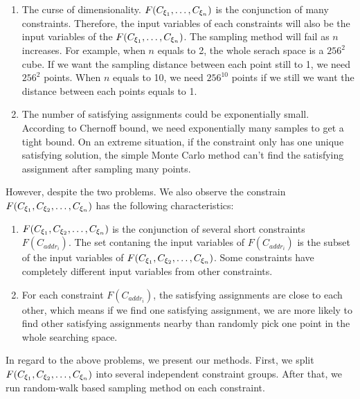 \begin{enumerate}
      \item The curse of dimensionality. $F(C_{{\xi}_{1}},\ldots,C_{{\xi}_{n}})$ is the conjunction of many
      constraints. Therefore, the input variables of each constraints will also be 
      the input variables of the  $F(C_{{\xi}_{1}},\ldots,C_{{\xi}_{n}})$. The sampling method will fail as 
      $n$ increases. For example, when $n$ equals to 2, the whole serach space is 
      a $256^2$ cube. If we want the sampling distance between each point still to 1,
      we need $256^2$ points. When $n$ equals to 10, we need $256^{10}$ points if we 
      still we want the distance between each points equals to 1. 

      \item The number of satisfying assignments could be exponentially small.
      According to Chernoff bound, we need exponentially many samples to get 
      a tight bound. On an extreme situation, if the constraint only has one unique
      satisfying solution, the simple Monte Carlo method can't find the satisfying
      assignment after sampling many points.
\end{enumerate}

However, despite the two problems. We also observe the constrain $F(C_{{\xi}_{1}},C_{{\xi}_{2}},\ldots,C_{{\xi}_{n}})$
has the following characteristics:
\begin{enumerate}
      \item $F(C_{{\xi}_{1}},C_{{\xi}_{2}},\ldots,C_{{\xi}_{n}})$ is the conjunction of several
      short constraints $F(C_{{addr}_i})$. The set contaning the input variables of 
      $F(C_{{addr}_i})$ is the subset of the input variables of $F(C_{{\xi}_{1}},C_{{\xi}_{2}},\ldots,C_{{\xi}_{n}})$.
      Some constraints have completely different input variables from other constraints.
      \item For each constraint $F(C_{{addr}_i})$, the satisfying assignments
      are close to each other, which means if we find one satisfying assignment, we 
      are more likely to find other satisfying assignments nearby than randomly
      pick one point in the whole searching space.
      
\end{enumerate}

In regard to the above problems, we present our methods. First, we split 
$F(C_{{\xi}_{1}},C_{{\xi}_{2}},\ldots,C_{{\xi}_{n}})$ into several independent constraint groups. After
that, we run random-walk based sampling method on each constraint.


